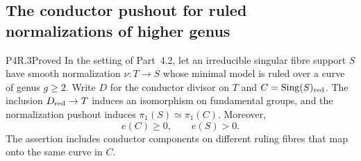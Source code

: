 \subsection{The conductor pushout for ruled normalizations of higher genus}

\begin{statement}{P4R.3}{Proved}
In the setting of Part~4.2, let an irreducible singular fibre
support $S$ have smooth normalization $\nu:T\to S$ whose
minimal model is ruled over a curve of genus $g\ge2$.
Write $D$ for the conductor divisor on $T$ and
$C=\operatorname{Sing}(S)_{\rm red}$.
The inclusion $D_{\rm red}\to T$ induces an isomorphism on
fundamental groups, and the normalization pushout induces
$\pi_1(S)\simeq\pi_1(C)$. Moreover,
\[
 e(C)\ge0,\qquad e(S)>0.
\]
The assertion includes conductor components on different
ruling fibres that map onto the same curve in $C$.
\end{statement}
